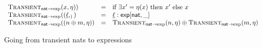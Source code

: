 \begin{figure}
  \begin{displaymath}
    \begin{array}{lcl}
      \textsc{Transient}_{\mathsf{nat} \to \exp}(x, \eta)) &=& \text{if } \exists x' = \eta(x) \text{ then } x' \text{ else } x \\
      \textsc{Transient}_{\mathsf{nat} \to \exp}((\underline{\ell}, _)) &=& \underline{\ell} : \mathsf{exp}[\mathsf{nat}, \_] \\
      \textsc{Transient}_{\mathsf{nat} \to \exp}((n \oplus m, \eta)) &=& \textsc{Transient}_{\mathsf{nat} \to \exp}(n, \eta) \oplus \textsc{Transient}_{\mathsf{nat} \to \exp}(m, \eta) \\
    \end{array}
  \end{displaymath}
  \caption{Going from transient nats to expressions}
\end{figure}
